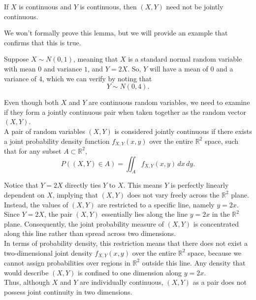 \begin{lemma}
    If \( X \) is continuous and \( Y \) is continuous, then \((X, Y)\) need not be jointly continuous.
\end{lemma}

We won't formally prove this lemma, but we will provide an example that confirms that this is true. 

\begin{example}
    Suppose \( X \sim N(0, 1) \), meaning that \( X \) is a standard normal random variable with mean \( 0 \) and variance \( 1 \), and \( Y = 2X \). So, \( Y \) will have a mean of \( 0 \) and a variance of \( 4 \), which we can verify by noting that
\[
Y \sim N(0, 4).
\]

Even though both \( X \) and \( Y \) are continuous random variables, we need to examine if they form a jointly continuous pair when taken together as the random vector \( (X, Y) \).\\

A pair of random variables \( (X, Y) \) is considered jointly continuous if there exists a joint probability density function \( f_{X,Y}(x, y) \) over the entire \( \mathbb{R}^2 \) space, such that for any subset \( A \subset \mathbb{R}^2 \),
\[
P((X, Y) \in A) = \iint_A f_{X,Y}(x, y) \, dx \, dy.
\]

Notice that \( Y = 2X \) directly ties \( Y \) to \( X \). This means \( Y \) is perfectly linearly dependent on \( X \), implying that \( (X, Y) \) does not vary freely across the \( \mathbb{R}^2 \) plane. Instead, the values of \( (X, Y) \) are restricted to a specific line, namely \( y = 2x \). Since \( Y = 2X \), the pair \( (X, Y) \) essentially lies along the line \( y = 2x \) in the \( \mathbb{R}^2 \) plane. Consequently, the joint probability measure of \( (X, Y) \) is concentrated along this line rather than spread across two dimensions.\\ 

In terms of probability density, this restriction means that there does not exist a two-dimensional joint density \( f_{X,Y}(x, y) \) over the entire \( \mathbb{R}^2 \) space, because we cannot assign probabilities over regions in \( \mathbb{R}^2 \) outside this line. Any density that would describe \( (X, Y) \) is confined to one dimension along \( y = 2x \).\\


Thus, although \( X \) and \( Y \) are individually continuous, \( (X, Y) \) as a pair does not possess joint continuity in two dimensions.
\end{example}

